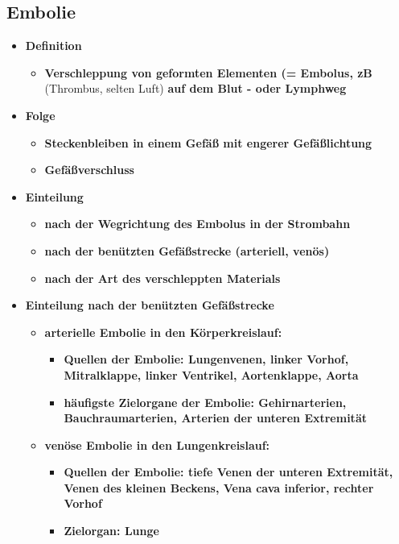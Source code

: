 	\subsection{Embolie}
		\begin{itemize}
			\item \textbf{Definition}
				\begin{itemize}
					\item \textbf{Verschleppung von geformten Elementen (= Embolus, zB } (Thrombus, selten Luft)\textbf{ auf dem Blut - oder Lymphweg}
				\end{itemize}
			\item \textbf{Folge}
					\begin{itemize}
						\item \textbf{Steckenbleiben in einem Gefäß mit engerer Gefäßlichtung}
						\item \textbf{Gefäßverschluss}
					\end{itemize}
			\item \textbf{Einteilung}
				\begin{itemize}
					\item \textbf{nach der Wegrichtung des Embolus in der Strombahn}
					\item \textbf{nach der benützten Gefäßstrecke (arteriell, venös)}
					\item \textbf{nach der Art des verschleppten Materials}
				\end{itemize}
			\item \textbf{Einteilung nach der benützten Gefäßstrecke}
				\begin{itemize}
					\item \textbf{arterielle Embolie in den Körperkreislauf:}
						\begin{itemize}
							\item \textbf{Quellen der Embolie: Lungenvenen, linker Vorhof, Mitralklappe, linker Ventrikel, Aortenklappe, Aorta}
							\item \textbf{häufigste Zielorgane der Embolie: Gehirnarterien, Bauchraumarterien, Arterien der unteren Extremität}
						\end{itemize}
					\item \textbf{venöse Embolie in den Lungenkreislauf:}
						\begin{itemize}
							\item \textbf{Quellen der Embolie: tiefe Venen der unteren Extremität, Venen des kleinen Beckens, Vena cava inferior, rechter Vorhof}
							\item \textbf{Zielorgan: Lunge}
						\end{itemize}
				\end{itemize}
		\end{itemize}
